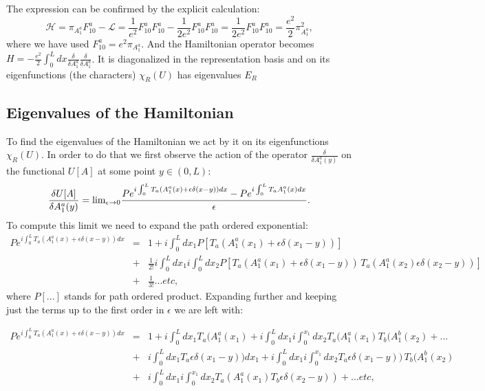 \documentclass[11pt]{report}
\theoremstyle{plain}
\theoremstyle{definition}
\theoremstyle{remark}
\theoremstyle{remark}
\numberwithin{equation}{section}
\begin{document}
The expression can be confirmed by the explicit calculation:
%
$$
\mathcal{H} = \pi_{A^a_1} F^a_{10} - \mathcal{L} = \frac{1}{e^2}F^a_{10}F^a_{10} - \frac{1}{2e^2}F^a_{10}F^a_{10} = \frac{1}{2e^2}F^a_{10}F^a_{10} = \frac{e^2}{2}\pi_{A^a_1}^2,
$$
where we have used $F^a_{10} = e^2\pi_{A^a_1}$.
And the Hamiltonian operator becomes $H = -\frac{e^2}{2} \int^L_0 dx \frac{\delta}{\delta A^a_1}\frac{\delta}{\delta A^a_1}$. It is diagonalized in the representation basis and on its eigenfunctions (the characters) $\chi_R(U)$ has eigenvalues $E_R$

\subsection{Eigenvalues of the Hamiltonian}
To find the eigenvalues of the Hamiltonian we act by it on its eigenfunctions $\chi_R(U)$.
In order to do that we first observe the action of the operator $\frac{\delta}{\delta A^a_1(y)}$ on the functional $U[A]$ at some point $y\in (0,L)$:
%
$$
\frac{\delta U[A]}{\delta A^a_1(y)}  =   {\rm lim}_{\epsilon \to 0}\frac{P e^{i\int_0^L T_a(A^a_1(x) + \epsilon \delta(x-y))dx} - P e^{i\int_0^L T_aA^a_1(x)dx}}{\epsilon}.
$$
To compute this limit we need to expand the path ordered exponential:
%
$$
\begin{array}{lll}
P e^{i\int_0^L T_a(A^a_1(x) + \epsilon \delta(x-y))dx} & = & 1 + i\int_0^L dx_1 P[T_a(A^a_1(x_1) + \epsilon \delta(x_1-y))] \\
& + & \frac{1}{2!}i\int_0^L dx_1 i\int_0^L dx_2P[T_a(A^a_1(x_1) +\epsilon \delta(x_1-y)) \, T_a(A^a_1(x_2) \epsilon \delta(x_2-y))] \\
&+& \frac{1}{3!}...etc,
\end{array}
$$
where $P[...]$ stands for path ordered product. Expanding further and keeping just the terms up to the first order in $\epsilon$ we are left with:
%
\begin{spacing}{1.45}
$
\begin{array}{lll}
P e^{i\int_0^L T_a(A^a_1(x) + \epsilon \delta(x-y))dx} & = & 1 + i\int_0^L dx_1T_a(A^a_1(x_1) + i\int_0^L dx_1 i\int_0^{x_1} dx_2T_a(A^a_1(x_1) T_b(A^b_1(x_2) + ... \\
&+& i\int_0^L dx_1T_a\epsilon \delta(x_1-y))dx_1 +  i\int_0^L dx_1 i\int_0^{x_1} dx_2T_a\epsilon \delta(x_1-y)) \, T_b(A^b_1(x_2) \\
 &+& i\int_0^L dx_1 i\int_0^{x_1} dx_2 T_a(A^a_1(x_1)T_b\epsilon \delta(x_2-y)) + ...etc,
\end{array}
$
\end{spacing}
\end{document}
